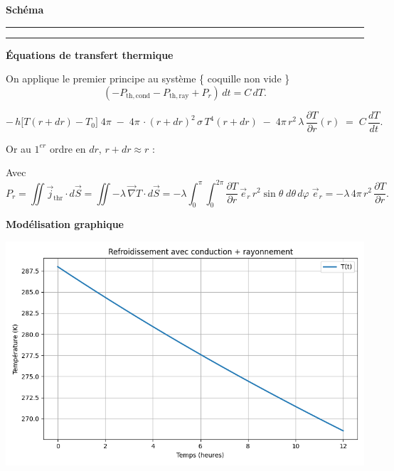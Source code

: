 \documentclass[a4paper,12pt]{article}
\begin{document}

\textbf{Schéma}
\\
\noindent\textcolor{gray}{\rule{\linewidth}{0.4pt}}

    
\begin{center}
  
\end{center}
\noindent\textcolor{gray}{\rule{\linewidth}{0.4pt}}
\vspace{0.5cm}

\textbf{Équations de transfert thermique}

On applique le premier principe au système \{ coquille non vide  \}
\[
(-P_{\mathrm{th,cond}} - P_{\mathrm{th,ray}} + P_r)\,dt = C\,dT.
\]

\[
-\,h\bigl[T(r+dr)-T_0\bigr]\;4\pi
\;-\;4\pi\,\cdot (r+dr)^2\,\sigma\,T^4(r+dr)
\;-\;4\pi\,r^2\,\lambda\,\frac{\partial T}{\partial r}(r)
\;=\;C\,\frac{dT}{dt}.
\]

\medskip

Or au \(1^{er}\) ordre en \(dr\), \(r+dr\approx r\) :
\\



\medskip

Avec
\[
P_{r}
= \iint\vec j_{\mathrm{thr}}\cdot d\vec S
= \iint -\lambda\,\vec{ \nabla } T\cdot d\vec S
= -\lambda
  \int_{0}^{\pi}\!\!\int_{0}^{2\pi}
    \frac{\partial T}{\partial r}\,\vec e_{r}\,
    r^2\sin\theta\;d\theta\,d\varphi\;\vec e_{r}
= -\lambda\,4\pi\,r^2\,\frac{\partial T}{\partial r}.
\]

\vspace{1cm}
\textbf{Modélisation graphique}
    
    \includegraphics[width=0.8\linewidth]{../modele3/figures/modele3_coquille-conduction-rayonnement.png}    
\end{document}
